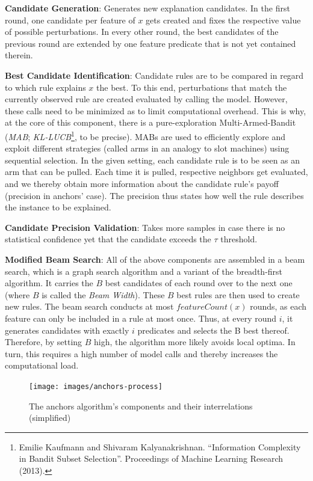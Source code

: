 \documentclass[
  12pt,
]{krantz}
\begin{document}
\textbf{Candidate Generation}: Generates new explanation candidates. In the first round, one candidate per feature of \(x\) gets created and fixes the respective value of possible perturbations. In every other round, the best candidates of the previous round are extended by one feature predicate that is not yet contained therein.

\textbf{Best Candidate Identification}: Candidate rules are to be compared in regard to which rule explains \(x\) the best. To this end, perturbations that match the currently observed rule are created evaluated by calling the model. However, these calls need to be minimized as to limit computational overhead. This is why, at the core of this component, there is a pure-exploration Multi-Armed-Bandit (\emph{MAB}; \emph{KL-LUCB}\footnote{Emilie Kaufmann and Shivaram Kalyanakrishnan. ``Information Complexity in Bandit Subset Selection''. Proceedings of Machine Learning Research (2013).}, to be precise). MABs are used to efficiently explore and exploit different strategies (called arms in an analogy to slot machines) using sequential selection. In the given setting, each candidate rule is to be seen as an arm that can be pulled. Each time it is pulled, respective neighbors get evaluated, and we thereby obtain more information about the candidate rule's payoff (precision in anchors' case). The precision thus states how well the rule describes the instance to be explained.

\textbf{Candidate Precision Validation}: Takes more samples in case there is no statistical confidence yet that the candidate exceeds the \(\tau\) threshold.

\textbf{Modified Beam Search}: All of the above components are assembled in a beam search, which is a graph search algorithm and a variant of the breadth-first algorithm. It carries the \(B\) best candidates of each round over to the next one (where \(B\) is called the \emph{Beam Width}). These \(B\) best rules are then used to create new rules. The beam search conducts at most \(featureCount(x)\) rounds, as each feature can only be included in a rule at most once. Thus, at every round \(i\), it generates candidates with exactly \(i\) predicates and selects the B best thereof. Therefore, by setting \(B\) high, the algorithm more likely avoids local optima. In turn, this requires a high number of model calls and thereby increases the computational load.

\begin{figure}

{\centering \texttt{[image: images/anchors-process]} 

}

\caption{The anchors algorithm’s components and their interrelations (simplified)}\label{fig:unnamed-chunk-30}
\end{figure}
\end{document}
